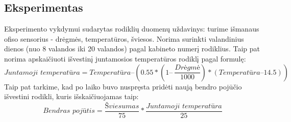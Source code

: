 \documentclass{VUMIFPSbakalaurinis}
\begin{document}
\subsection{Eksperimentas}

Eksperimento vykdymui sudarytas rodiklių duomenų uždavinys: turime išmanaus ofiso sensorius - drėgmės, temperatūros, šviesos. Norima surinkti valandinius dienos (nuo 8 valandos iki 20 valandos) pagal kabineto numerį rodiklius. Taip pat norima apskaičiuoti išvestinį juntamosios temperatūros rodiklį pagal formulę\cite{anderson2013methods}: 
\[\textit{Juntamoji temperatūra} = \textit{Temperatūra} – (0.55 * (1 –\>\frac{\textit{Drėgmė}}{1000}) * (\textit{Temperatūra} – 14.5))\]
Taip pat tarkime, kad po laiko buvo nuspręsta pridėti naują bendro pojūčio išvestini rodikli, kuris išskaičiuojamas taip: 
\[\textit{Bendras pojūtis} = \frac{\textit{Šviesumas}}{75} * \frac{\textit{Juntamoji temperatūra}}{25} \]
\end{document}
